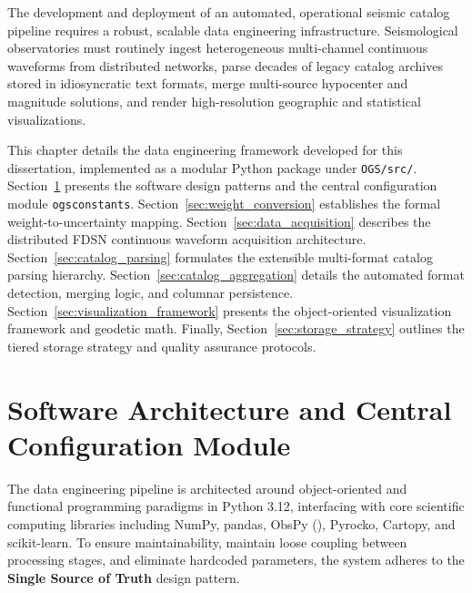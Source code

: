 
\label{chap:data_engineering}

The development and deployment of an automated, operational seismic catalog pipeline requires a robust, scalable data engineering infrastructure. Seismological observatories must routinely ingest heterogeneous multi-channel continuous waveforms from distributed networks, parse decades of legacy catalog archives stored in idiosyncratic text formats, merge multi-source hypocenter and magnitude solutions, and render high-resolution geographic and statistical visualizations.

This chapter details the data engineering framework developed for this dissertation, implemented as a modular Python package under \texttt{OGS/src/}. Section~\ref{sec:software_architecture} presents the software design patterns and the central configuration module \texttt{ogsconstants}. Section~\ref{sec:weight_conversion} establishes the formal weight-to-uncertainty mapping. Section~\ref{sec:data_acquisition} describes the distributed FDSN continuous waveform acquisition architecture. Section~\ref{sec:catalog_parsing} formulates the extensible multi-format catalog parsing hierarchy. Section~\ref{sec:catalog_aggregation} details the automated format detection, merging logic, and columnar persistence. Section~\ref{sec:visualization_framework} presents the object-oriented visualization framework and geodetic math. Finally, Section~\ref{sec:storage_strategy} outlines the tiered storage strategy and quality assurance protocols.

\section{Software Architecture and Central Configuration Module}
\label{sec:software_architecture}

The data engineering pipeline is architected around object-oriented and functional programming paradigms in Python 3.12, interfacing with core scientific computing libraries including NumPy, pandas, ObsPy (\cite{ObsPy}), Pyrocko, Cartopy, and scikit-learn. To ensure maintainability, maintain loose coupling between processing stages, and eliminate hardcoded parameters, the system adheres to the \textbf{Single Source of Truth} design pattern.

